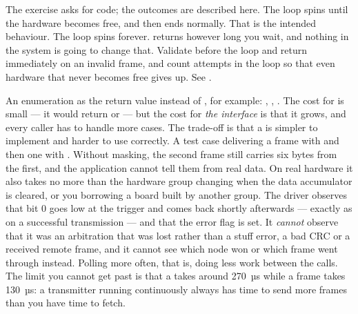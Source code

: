 The exercise asks for code; the outcomes are described here.
 The loop spins until the hardware becomes free, and then ends normally. That is the
intended behaviour.
 The loop spins forever.  returns  however long you wait, and
nothing in the system is going to change that.
 Validate before the loop and return immediately on an invalid frame, and count attempts in
the loop so that even hardware that never becomes free gives up. See .

 An enumeration as the return value instead of , for example: ,
, . The cost for  is small --- it would return
 or  --- but the cost for \emph{the interface} is that it grows, and
every caller has to handle more cases. The trade-off is that a  is simpler to implement
and harder to use correctly.
 A test case delivering a frame with  and then one with .
Without masking, the second frame still carries six bytes from the first, and the application
cannot tell them from real data. On real hardware it also takes no more than the hardware group
changing when the data accumulator is cleared, or you borrowing a board built by another group.
 The driver observes that  bit 0 goes low at the trigger and comes back
shortly afterwards --- exactly as on a successful transmission --- and that the error flag is set.
It \emph{cannot} observe that it was an arbitration that was lost rather than a stuff error, a bad
CRC or a received remote frame, and it cannot see which node won or which frame went through
instead.
 Polling more often, that is, doing less work between the  calls. The limit
you cannot get past is that a  takes around 270~µs while a frame takes 130~µs: a
transmitter running continuously always has time to send more frames than you have time to fetch.
